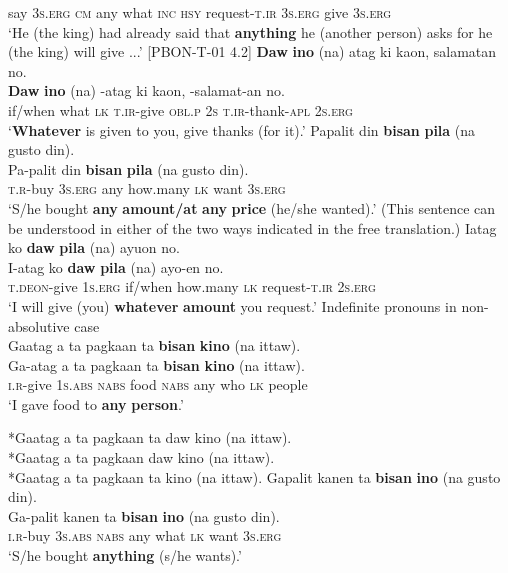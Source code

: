 say  3\textsc{s.erg}  \textsc{cm}  any  what  \textsc{inc}  \textsc{hsy}  request\textsc{-t.ir}  3\textsc{s.erg}  give  3\textsc{s.erg} \\
\glt `He (the king) had already said that \textbf{anything} he (another person) asks for he (the king) will give ...’ [PBON-T-01 4.2]
\z
\ea
\textbf{Daw}  \textbf{ino}  (na)  atag  ki  kaon,  salamatan  no. \\\smallskip
 \gll \textbf{Daw}  \textbf{ino}  (na)  \emptyset{}-atag  ki  kaon,  \emptyset{}-salamat-an  no. \\
if/when  what  \textsc{lk}  \textsc{t.ir-}give  \textsc{obl.p}  \textsc{2s}  \textsc{t.ir}-thank\textsc{-apl}  2\textsc{s.erg} \\
\glt ‘\textbf{Whatever} is given to you, give thanks (for it).’
\z
\ea
Papalit  din  \textbf{bisan}  \textbf{pila}  (na  gusto  din). \\\smallskip
 \gll Pa-palit  din  \textbf{bisan}  \textbf{pila}  (na  gusto  din). \\
\textsc{t.r}-buy  3\textsc{s.erg}  any  how.many  \textsc{lk}  want  3\textsc{s.erg} \\
\glt ‘S/he bought \textbf{any} \textbf{amount/at} \textbf{any} \textbf{price} (he/she wanted).’ (This sentence can be understood in either of the two ways indicated in the free translation.)
\z
\ea
Iatag  ko  \textbf{daw}  \textbf{pila}  (na)  ayuon  no. \\\smallskip
 \gll I-atag  ko  \textbf{daw}  \textbf{pila}  (na)  ayo-en  no. \\
\textsc{t.deon}-give  1\textsc{s.erg}  if/when  how.many  \textsc{lk}  request\textsc{-t.ir}  2\textsc{s.erg} \\
\glt ‘I will give (you) \textbf{whatever} \textbf{amount} you request.’
\z
\ea
Indefinite pronouns in non-absolutive case \\
Gaatag  a  ta  pagkaan  ta  \textbf{bisan}  \textbf{kino}  (na  ittaw). \\\smallskip
 \gll Ga-atag  a  ta  pagkaan  ta  \textbf{bisan}  \textbf{kino}  (na  ittaw). \\
\textsc{i.r-}give  1\textsc{s.abs}  \textsc{nabs}  food  \textsc{nabs}  any  who  \textsc{lk}  people \\
\glt ‘I gave food to \textbf{any} \textbf{person}.’ \\\smallskip

*Gaatag a ta pagkaan ta daw kino (na ittaw). \\
*Gaatag a ta pagkaan daw kino (na ittaw). \\
*Gaatag a ta pagkaan ta kino (na ittaw).
\z
\ea
Gapalit  kanen  ta  \textbf{bisan}  \textbf{ino}  (na  gusto  din). \\\smallskip
 \gll Ga-palit  kanen  ta  \textbf{bisan}  \textbf{ino}  (na  gusto  din). \\
\textsc{i.r}-buy  3\textsc{s.abs}  \textsc{nabs}  any  what  \textsc{lk}  want  3\textsc{s.erg} \\
\glt ‘S/he bought \textbf{anything} (s/he wants).’ \\\smallskip


